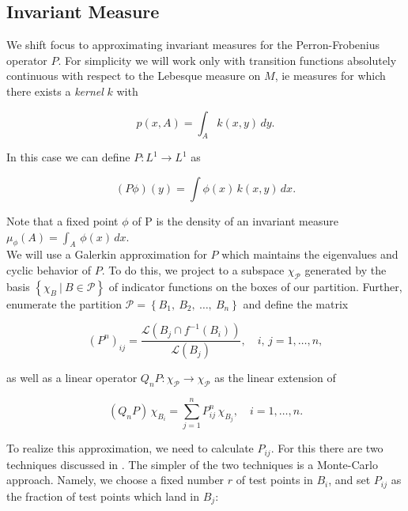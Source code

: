 
\subsection{Invariant Measure}

We shift focus to approximating invariant measures for the Perron-Frobenius operator $P$.
For simplicity we will work only with transition functions absolutely continuous with 
respect to the Lebesque measure on $M$, ie measures for which there exists a 
\emph{kernel} $k$ with 

\begin{equation}
    \label{eq:kernel}
    p(x, A) = \int_A k(x, y)\, dy.
\end{equation}

In this case we can define $P: L^1 \to L^1$ as 

\begin{equation}
    (P \phi)(y) = \int \phi (x)\, k(x, y)\, dx.
\end{equation}

Note that a fixed point $\phi$ of P is the density of an invariant measure 
$\mu_\phi (A) = \int_A\, \phi(x)\, dx$. \\

We will use a Galerkin approximation for $P$ which maintains the eigenvalues and cyclic 
behavior of $P$. To do this, we project to a subspace 
$\chi_{\mathcal{P}}$ generated by the basis $\left\{ \chi_B\ \vert\ B \in \mathcal{P} \right\}$ 
of indicator functions on the boxes of our partition. Further, enumerate the partition 
$\mathcal{P} = \left\{ B_1,\ B_2,\ \ldots,\ B_n \right\}$ and define the matrix 

\begin{equation}
    \label{eq:pij}
    (P^n)_{ij} = \frac{\mathcal{L}\left(B_j \cap f^{-1}(B_i)\right)}{\mathcal{L}(B_j)}, 
    \quad i,\, j = 1, \ldots, n,
\end{equation}

as well as a linear operator $Q_n P : \chi_{\mathcal{P}} \to \chi_{\mathcal{P}}$ as 
the linear extension of 

\begin{equation}
    \label{eq:qnp}
    (Q_n P)\, \chi_{B_i} = \sum_{j = 1}^n P_{ij}^n\, \chi_{B_j}, \quad i = 1, \ldots, n.
\end{equation}

To realize this approximation, we need to calculate $P_{ij}$. For this there are two 
techniques discussed in \cite*{algGAIO}. The simpler of the two techniques is a 
Monte-Carlo approach. Namely, we choose a fixed number $r$ of test points in 
$B_i$, and set $P_{ij}$ as the fraction of test points which land in $B_j$:

